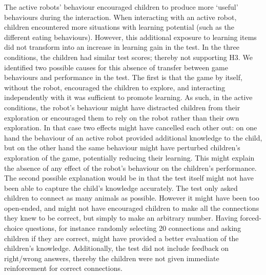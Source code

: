 The active robots' behaviour encouraged children to produce more `useful' behaviours during the interaction. When interacting with an active robot, children encountered more situations with learning potential (such as the different eating behaviours). However, this additional exposure to learning items did not transform into an increase in learning gain in the test. In the three conditions, the children had similar test scores; thereby not supporting H3. We identified two possible causes for this absence of transfer between game behaviours and performance in the test. The first is that the game by itself, without the robot, encouraged the children to explore, and interacting independently with it was sufficient to promote learning. As such, in the active conditions, the robot's behaviour might have distracted children from their exploration or encouraged them to rely on the robot rather than their own exploration. In that case two effects might have cancelled each other out: on one hand the behaviour of an active robot provided additional knowledge to the child, but on the other hand the same behaviour might have perturbed children's exploration of the game, potentially reducing their learning. This might explain the absence of any effect of the robot's behaviour on the children's performance. The second possible explanation would be in that the test itself might not have been able to capture the child's knowledge accurately. The test only asked children to connect as many animals as possible. However it might have been too open-ended, and might not have encouraged children to make all the connections they knew to be correct, but simply to make an arbitrary number. %
Having forced-choice questions, for instance randomly selecting 20 connections and asking children if they are correct, might have provided a better evaluation of the children's knowledge. Additionally, the test did not include feedback on right/wrong answers, thereby the children were not given immediate reinforcement for correct connections.


